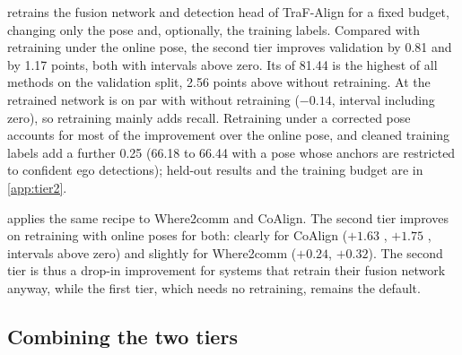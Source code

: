  retrains the fusion network and detection head of TraF-Align for a fixed budget, changing only the pose and, optionally, the training labels.
Compared with retraining under the online pose, the second tier improves validation \apseven by 0.81 and \apfive by 1.17 points, both with intervals above zero.
Its \apfive of 81.44 is the highest of all methods on the validation split, 2.56 points above \method{} without retraining.
At \apseven the retrained network is on par with \method{} without retraining ($-0.14$, interval including zero), so retraining mainly adds recall.
Retraining under a corrected pose accounts for most of the improvement over the online pose, and cleaned training labels add a further 0.25 \apseven (66.18 to 66.44 with a \method pose whose anchors are restricted to confident ego detections); held-out results and the training budget are in \cref{app:tier2}.

\begin{table}[t]
  \centering
  \caption{\textbf{The same recipe on two more architectures}, validation, three seeds. \apseven / \apfive of the fusion network retrained with the online pose, with a \method pose whose anchors are restricted to confident ego detections, and with \method poses and cleaned labels (second tier); last two columns: second tier minus the online pose with 95\% intervals.}
  \label{tab:tier2cross}
  \small
  \setlength{\tabcolsep}{3.5pt}
\end{table}

 applies the same recipe to Where2comm and CoAlign.
The second tier improves on retraining with online poses for both: clearly for CoAlign ($+1.63$ \apseven, $+1.75$ \apfive, intervals above zero) and slightly for Where2comm ($+0.24$, $+0.32$).
The second tier is thus a drop-in improvement for systems that retrain their fusion network anyway, while the first tier, which needs no retraining, remains the default.

\subsection{Combining the two tiers}
\label{sec:combo}

